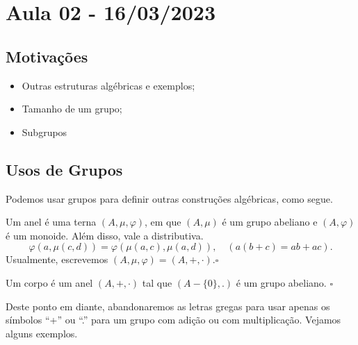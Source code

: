 \documentclass[Algebra/algebra_notes.tex]{subfiles}
\begin{document}
\section{Aula 02 - 16/03/2023}
\subsection{Motivações}
\begin{itemize}
	\item Outras estruturas algébricas e exemplos;
	\item Tamanho de um grupo;
	\item Subgrupos
\end{itemize}
\subsection{Usos de Grupos}
Podemos usar grupos para definir outras construções algébricas, como segue.
\begin{def*}
	Um anel é uma terna $(A, \mu, \varphi)$, em que $(A, \mu)$ é um grupo abeliano e $(A, \varphi)$ é um monoide. Além disso,
	vale a distributiva.
	$$
		\varphi(a, \mu(c, d)) = \varphi(\mu(a, c), \mu(a, d)), \quad (a(b + c) = ab + ac).
	$$
	Usualmente, escrevemos $(A, \mu, \varphi) = (A, +, \cdot).\square$
\end{def*}
\begin{def*}
	Um corpo é um anel $(A, +, \cdot)$ tal que $(A-\{0\}, .)$ é um grupo abeliano. $\square$
\end{def*}
Deste ponto em diante, abandonaremos as letras gregas para usar apenas os símbolos ``+'' ou ``.'' para um grupo com adição
ou com multiplicação. Vejamos alguns exemplos.
\end{document}

